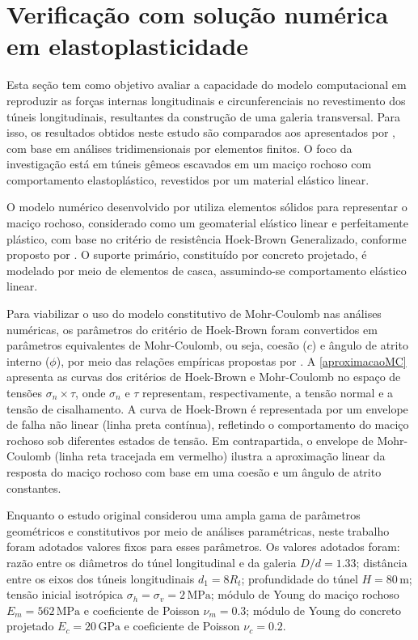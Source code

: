 \section{Verificação com solução numérica em elastoplasticidade}

Esta seção tem como objetivo avaliar a capacidade do modelo computacional em reproduzir as forças internas longitudinais e circunferenciais no revestimento dos túneis longitudinais, resultantes da construção de uma galeria transversal. Para isso, os resultados obtidos neste estudo são comparados aos apresentados por , com base em análises tridimensionais por elementos finitos. O foco da investigação está em túneis gêmeos escavados em um maciço rochoso com comportamento elastoplástico, revestidos por um material elástico linear.

O modelo numérico desenvolvido por  utiliza elementos sólidos para representar o maciço rochoso, considerado como um geomaterial elástico linear e perfeitamente plástico, com base no critério de resistência Hoek-Brown Generalizado, conforme proposto por . O suporte primário, constituído por concreto projetado, é modelado por meio de elementos de casca, assumindo-se comportamento elástico linear.

Para viabilizar o uso do modelo constitutivo de Mohr-Coulomb nas análises numéricas, os parâmetros do critério de Hoek-Brown foram convertidos em parâmetros equivalentes de Mohr-Coulomb, ou seja, coesão ($c$) e ângulo de atrito interno ($\phi$), por meio das relações empíricas propostas por . A \autoref{aproximacaoMC} apresenta as curvas dos critérios de Hoek-Brown e Mohr-Coulomb no espaço de tensões $\sigma_n \times \tau$, onde  $\sigma_n$ e $\tau$ representam, respectivamente, a tensão normal e a tensão de cisalhamento. A curva de Hoek-Brown é representada por um envelope de falha não linear (linha preta contínua), refletindo o comportamento do maciço rochoso sob diferentes estados de tensão. Em contrapartida, o envelope de Mohr-Coulomb (linha reta tracejada em vermelho) ilustra a aproximação linear da resposta do maciço rochoso com base em uma coesão e um ângulo de atrito constantes.

Enquanto o estudo original considerou uma ampla gama de parâmetros geométricos e constitutivos por meio de análises paramétricas, neste trabalho foram adotados valores fixos para esses parâmetros. Os valores adotados foram: razão entre os diâmetros do túnel longitudinal e da galeria $D/d = 1.33$; distância entre os eixos dos túneis longitudinais $d_1 = 8R_t$; profundidade do túnel $H = 80\,\text{m}$; tensão inicial isotrópica $\sigma_h = \sigma_v = 2\,\text{MPa}$; módulo de Young do maciço rochoso $E_m = 562\,\text{MPa}$ e coeficiente de Poisson $\nu_m = 0.3$; módulo de Young do concreto projetado $E_{c} = 20\,\text{GPa}$ e coeficiente de Poisson $\nu_{c} = 0.2$.

